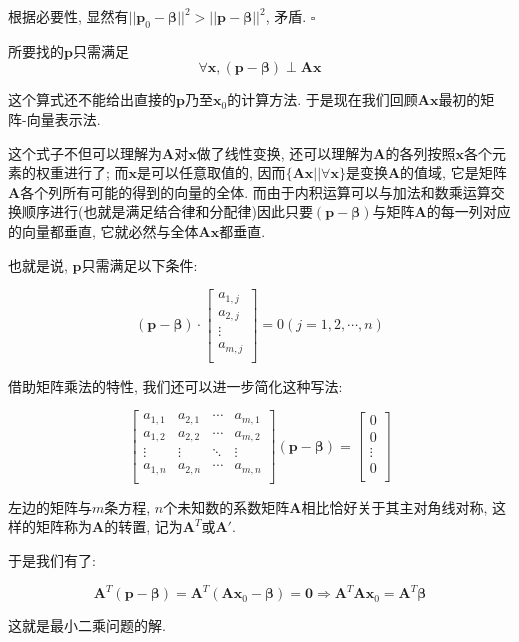 \documentclass[UTF8]{ctexart}
\begin{document}
\begin{prf}
				根据必要性, 显然有$||\bm{p}_0-\bm{\beta}||^2>||\bm{p}-\bm{\beta}||^2$, 矛盾. $\square$

				所要找的$\bm{p}$只需满足$$\forall\bm{x}, (\bm{p}-\bm{\beta})\perp\bm{A}\bm{x}$$
		
				这个算式还不能给出直接的$\bm{p}$乃至$\bm{x}_0$的计算方法. 于是现在我们回顾$\bm{A}\bm{x}$最初的矩阵-向量表示法. 
				
				这个式子不但可以理解为$\bm{A}$对$\bm{x}$做了线性变换, 还可以理解为$\bm{A}$的各列按照$\bm{x}$各个元素的权重进行了; 而$\bm{x}$是可以任意取值的, 因而$\{\bm{A}\bm{x}||\forall\bm{x}\}$是变换$\bm{A}$的值域, 它是矩阵$\bm{A}$各个列所有可能的 得到的向量的全体. 而由于内积运算可以与加法和数乘运算交换顺序进行(也就是满足结合律和分配律)因此只要$(\bm{p}-\bm{\beta})$与矩阵$\bm{A}$的每一列对应的向量都垂直, 它就必然与全体$\bm{A}\bm{x}$都垂直. 
				
				也就是说, $\bm{p}$只需满足以下条件: 
				
				$$(\bm{p}-\bm{\beta})\cdot\begin{bmatrix}
				a_{1,j}\\
				a_{2,j}\\
				\vdots\\
				a_{m,j}\\
				\end{bmatrix}=0(j=1,2,\cdots,n)$$
				
				借助矩阵乘法的特性, 我们还可以进一步简化这种写法: 
				
				$$\begin{bmatrix}
				a_{1,1} & a_{2,1} & \cdots & a_{m,1}\\
				a_{1,2} & a_{2,2} & \cdots & a_{m,2}\\
				\vdots & \vdots & \ddots & \vdots\\
				a_{1,n} & a_{2,n} & \cdots & a_{m,n}\\
				\end{bmatrix}(\bm{p}-\bm{\beta})=
				\begin{bmatrix}
				0\\
				0\\
				\vdots\\
				0\\
				\end{bmatrix}$$
				
				左边的矩阵与$m$条方程, $n$个未知数的系数矩阵$\bm{A}$相比恰好关于其主对角线对称, 这样的矩阵称为$\bm{A}$的转置, 记为$\bm{A}^T$或$\bm{A}'$. 
				
				于是我们有了: 
				
				$$\bm{A}^T(\bm{p}-\bm{\beta})=\bm{A}^T(\bm{A}\bm{x}_0-\bm{\beta})=\mathbf{0}\Longrightarrow \bm{A}^T\bm{A}\bm{x}_0=\bm{A}^T\bm{\beta}$$
				
				这就是最小二乘问题的解.
		\end{prf} 
\end{document}
